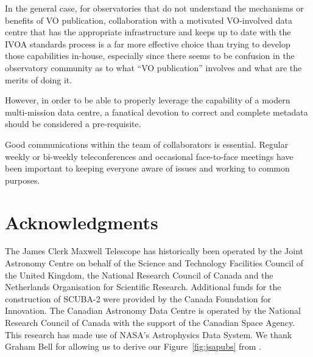 \documentclass[final,authoryear,5p,times,twocolumn]{elsarticle}
\begin{document}
In the general case, for observatories that do not understand the
mechanisms or benefits of VO publication, collaboration with a
motivated VO-involved data centre that has the appropriate
infrastructure and keeps up to date with the IVOA standards process is
a far more effective choice than trying to develop those capabilities
in-house, especially since there seems to be confusion in the
observatory community as to what ``VO publication'' involves and what
are the merits of doing it.

However, in order to be able to properly leverage the capability of a
modern multi-mission data centre, a fanatical devotion to correct and
complete metadata should be considered a pre-requisite.

Good communications within the team of collaborators is essential.  Regular
weekly or bi-weekly teleconferences and occasional face-to-face meetings
have been important to keeping everyone aware of issues and working to
common purposes.

\section*{Acknowledgments}

The James Clerk Maxwell Telescope has historically been operated by
the Joint Astronomy Centre on behalf of the Science and Technology
Facilities Council of the United Kingdom, the National Research
Council of Canada and the Netherlands Organisation for Scientific
Research.  Additional funds for the construction of SCUBA-2 were
provided by the Canada Foundation for Innovation.
The Canadian Astronomy Data Centre is operated by the
National Research Council of Canada with the support of the Canadian
Space Agency. This research has made use of NASA's Astrophysics
Data System. We thank Graham Bell for allowing us to derive our
Figure~\ref{fig:jsapubs} from \citet{2014SPIE9152-93}.
\end{document}
